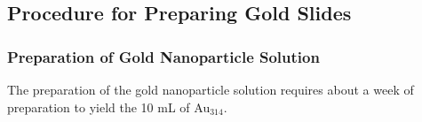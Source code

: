 \documentclass[12pt,oneside,english]{article}
\begin{document}
	
	\subsection{Procedure for Preparing Gold Slides}
	
	\subsubsection{Preparation of Gold Nanoparticle Solution}
	The preparation of the gold nanoparticle solution requires about a week of preparation to yield the 10 mL of Au$_{314}$.
	
\end{document}
